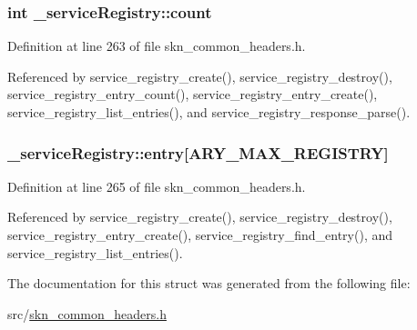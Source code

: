 \subsubsection[{count}]{\setlength{\rightskip}{0pt plus 5cm}int \+\_\+service\+Registry\+::count}\label{struct__service_registry_a68062b14c6c9cb411e3602be664425bc}


Definition at line 263 of file skn\+\_\+common\+\_\+headers.\+h.



Referenced by service\+\_\+registry\+\_\+create(), service\+\_\+registry\+\_\+destroy(), service\+\_\+registry\+\_\+entry\+\_\+count(), service\+\_\+registry\+\_\+entry\+\_\+create(), service\+\_\+registry\+\_\+list\+\_\+entries(), and service\+\_\+registry\+\_\+response\+\_\+parse().

\hypertarget{struct__service_registry_ad35429e298009925477ba528ea500fe8}{}
\subsubsection[{entry}]{ \+\_\+service\+Registry\+::entry\mbox{[}{\bf A\+R\+Y\+\_\+\+M\+A\+X\+\_\+\+R\+E\+G\+I\+S\+T\+R\+Y}\mbox{]}}\label{struct__service_registry_ad35429e298009925477ba528ea500fe8}


Definition at line 265 of file skn\+\_\+common\+\_\+headers.\+h.



Referenced by service\+\_\+registry\+\_\+create(), service\+\_\+registry\+\_\+destroy(), service\+\_\+registry\+\_\+entry\+\_\+create(), service\+\_\+registry\+\_\+find\+\_\+entry(), and service\+\_\+registry\+\_\+list\+\_\+entries().



The documentation for this struct was generated from the following file\+:\begin{DoxyCompactItemize}
\item 
src/\hyperlink{skn__common__headers_8h}{skn\+\_\+common\+\_\+headers.\+h}\end{DoxyCompactItemize}
